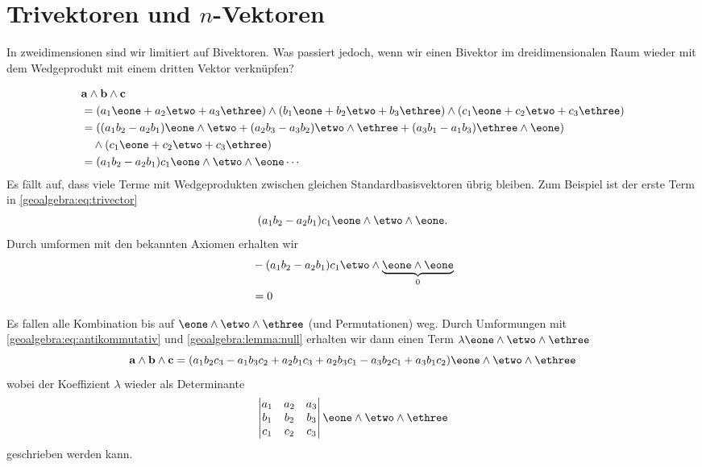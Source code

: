 \section{Trivektoren und $n$-Vektoren}
\label{geoalgebra:section:trivectors-n-vectors}
In zweidimensionen sind wir limitiert auf Bivektoren. Was passiert jedoch, wenn wir einen Bivektor
im dreidimensionalen Raum wieder mit dem Wedgeprodukt mit einem dritten Vektor verknüpfen?

{
\renewcommand{\a}{\mathbf{a}}
\renewcommand{\b}{\mathbf{b}}
\renewcommand{\c}{\mathbf{c}}
\begin{equation} 
\begin{aligned}
&\a \wedge \b \wedge \c \\ 
&= (a_1 \eone + a_2 \etwo + a_3 \ethree) \wedge (b_1 \eone + b_2 \etwo + b_3 \ethree) \wedge (c_1 \eone + c_2 \etwo + c_3 \ethree) \\
&= ((a_1 b_2 - a_2 b_1) \eone \wedge \etwo +(a_2 b_3 - a_3 b_2) \etwo \wedge \ethree +(a_3 b_1 - a_1 b_3) \ethree \wedge \eone) \\
&\quad\wedge (c_1 \eone + c_2 \etwo + c_3 \ethree) \\
&= (a_1 b_2 - a_2 b_1) c_1 \eone \wedge \etwo \wedge \eone \cdots
\end{aligned}
\label{geoalgebra:eq:trivector}
\end{equation}
Es fällt auf, dass viele Terme mit Wedgeprodukten zwischen gleichen Standardbasisvektoren übrig bleiben. Zum Beispiel ist der erste Term in \eqref{geoalgebra:eq:trivector}
\begin{equation}
(a_1 b_2 - a_2 b_1) c_1 \eone \wedge \etwo \wedge \eone.
\end{equation}
Durch umformen mit den bekannten Axiomen erhalten wir
\begin{equation}
\begin{aligned}
&-(a_1 b_2 - a_2 b_1) c_1 \etwo \wedge \underbrace{\eone \wedge \eone}_{0} \\
&=0
\end{aligned}
\end{equation}

Es fallen alle Kombination bis auf $\eone \wedge \etwo \wedge \ethree$ (und Permutationen) weg.
Durch Umformungen mit \eqref{geoalgebra:eq:antikommutativ} und
\eqref{geoalgebra:lemma:null} erhalten wir dann einen Term $\lambda \eone \wedge \etwo \wedge \ethree$
\begin{equation}
\a \wedge \b \wedge \c = (a_1 b_2 c_3 - a_1 b_3 c_2 + a_2 b_1 c_3 + a_2 b_3 c_1 - a_3 b_2 c_1 + a_3 b_1 c_2) \eone \wedge \etwo \wedge \ethree
\end{equation}
wobei der Koeffizient $\lambda$ wieder als Determinante
\begin{equation}
\begin{vmatrix} a_1 & a_2 & a_3 \\ b_1 & b_2 & b_3 \\ c_1 & c_2 & c_3 \end{vmatrix} \eone \wedge \etwo \wedge \ethree
\end{equation}
geschrieben werden kann.

}
